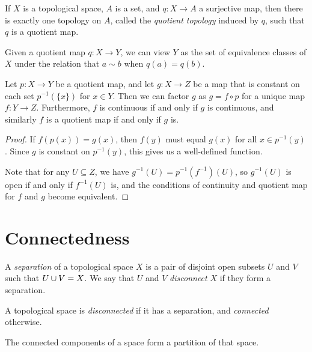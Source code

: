 \begin{defn}
    If $X$ is a topological space, $A$ is a set, and $q: X \to A$ a surjective map, then there is exactly one topology on $A$, called the \emph{quotient topology} induced by $q$, such that $q$ is a quotient map.
\end{defn}

\begin{rmk}
    Given a quotient map $q: X \to Y$, we can view $Y$ as the set of equivalence classes of $X$ under the relation that $a \sim b$ when $q(a) = q(b)$.
\end{rmk}

\begin{thm}
    Let $p: X \to Y$ be a quotient map, and let $g: X \to Z$ be a map that is constant on each set $p^{-1}(\{x\})$ for $x \in Y$. Then we can factor $g$ as $g = f \circ p$ for a unique map $f: Y \to Z$. Furthermore, $f$ is continuous if and only if $g$ is continuous, and similarly $f$ is a quotient map if and only if $g$ is.
\end{thm}

\begin{proof}
    If $f(p(x)) = g(x)$, then $f(y)$ must equal $g(x)$ for all $x \in p^{-1}(y)$. Since $g$ is constant on $p^{-1}(y)$, this gives us a well-defined function.

    Note that for any $U \subseteq Z$, we have $g^{-1}(U) = p^{-1}(f^{-1})(U)$, so $g^{-1}(U)$ is open if and only if $f^{-1}(U)$ is, and the conditions of continuity and quotient map for $f$ and $g$ become equivalent.
\end{proof}

\section{Connectedness}

\begin{defn}
    A \emph{separation} of a topological space $X$ is a pair of disjoint open subsets $U$ and $V$ such that $U \cup V = X$. We say that $U$ and $V$ \emph{disconnect} $X$ if they form a separation.
\end{defn}

\begin{defn}
    A topological space is \emph{disconnected} if it has a separation, and \emph{connected} otherwise.
\end{defn}

\begin{prop}
    The connected components of a space form a partition of that space.
\end{prop}

